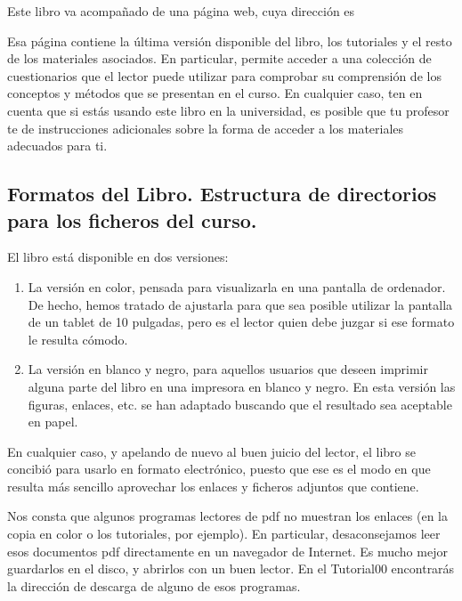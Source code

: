 \noindent Este libro va acompañado de una página web, cuya dirección es
            \begin{center}
            \end{center}
Esa página contiene la última versión disponible del libro, los tutoriales y el resto de los materiales asociados. En particular, permite acceder a una colección de cuestionarios que el lector puede utilizar para comprobar su comprensión de los conceptos y métodos que se presentan en el curso. En cualquier caso, ten en cuenta que si estás usando este libro en la universidad, es posible que tu profesor te de instrucciones adicionales sobre la forma de acceder a los materiales adecuados para ti.

\subsection*{Formatos del Libro. Estructura de directorios para los ficheros del curso.}

\noindent El libro está disponible en dos versiones:
\begin{enumerate}
  \item La versión en color, pensada para visualizarla en una pantalla de ordenador. De hecho, hemos tratado de ajustarla para que sea posible utilizar la pantalla de un tablet de 10 pulgadas, pero es el lector quien debe juzgar si ese formato le resulta cómodo.

  \item La versión en blanco y negro, para aquellos usuarios que deseen imprimir alguna parte del libro en una impresora en blanco y negro.  En esta versión las figuras, enlaces, etc. se han adaptado buscando que el resultado sea aceptable en papel.
\end{enumerate}
En cualquier caso, y apelando de nuevo al buen juicio del lector, el libro se concibió para usarlo en formato electrónico, puesto que ese es el modo en que resulta más sencillo aprovechar los enlaces y ficheros adjuntos que contiene.

Nos consta que algunos programas lectores de pdf no muestran los enlaces (en la copia en color o los tutoriales, por ejemplo). En particular, desaconsejamos leer esos documentos pdf directamente en un navegador de Internet. Es mucho mejor guardarlos en el disco, y abrirlos con un buen lector. En el Tutorial00 encontrarás la dirección de descarga de alguno de esos programas.

